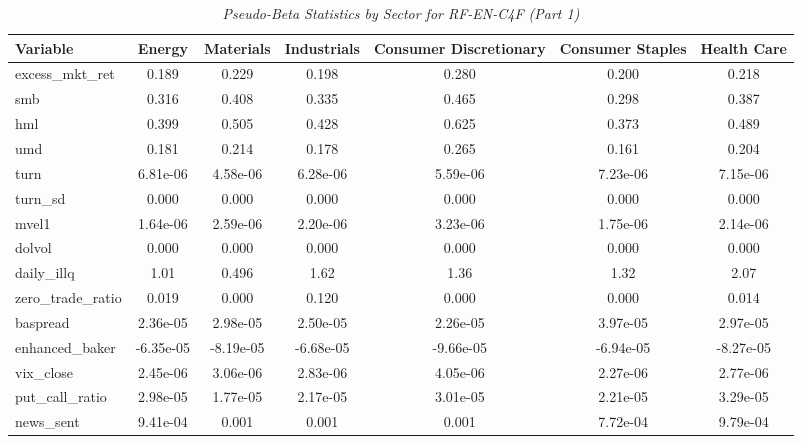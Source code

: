         \begin{table}[ht]
        \centering
        \caption{\textit{Pseudo-Beta Statistics by Sector for RF-EN-C4F (Part 1)}}
        \label{tab:rfi_statistics_1}
        \begin{tabular}{lcccccc}
        \toprule
        \textbf{Variable} & \textbf{Energy} & \textbf{Materials} & \textbf{Industrials} & \textbf{Consumer Discretionary} & \textbf{Consumer Staples} & \textbf{Health Care} \\
        \midrule
        excess\_mkt\_ret & 0.189 & 0.229 & 0.198 & 0.280 & 0.200 & 0.218 \\
smb & 0.316 & 0.408 & 0.335 & 0.465 & 0.298 & 0.387 \\
hml & 0.399 & 0.505 & 0.428 & 0.625 & 0.373 & 0.489 \\
umd & 0.181 & 0.214 & 0.178 & 0.265 & 0.161 & 0.204 \\
turn & 6.81e-06 & 4.58e-06 & 6.28e-06 & 5.59e-06 & 7.23e-06 & 7.15e-06 \\
turn\_sd & 0.000 & 0.000 & 0.000 & 0.000 & 0.000 & 0.000 \\
mvel1 & 1.64e-06 & 2.59e-06 & 2.20e-06 & 3.23e-06 & 1.75e-06 & 2.14e-06 \\
dolvol & 0.000 & 0.000 & 0.000 & 0.000 & 0.000 & 0.000 \\
daily\_illq & 1.01 & 0.496 & 1.62 & 1.36 & 1.32 & 2.07 \\
zero\_trade\_ratio & 0.019 & 0.000 & 0.120 & 0.000 & 0.000 & 0.014 \\
baspread & 2.36e-05 & 2.98e-05 & 2.50e-05 & 2.26e-05 & 3.97e-05 & 2.97e-05 \\
enhanced\_baker & -6.35e-05 & -8.19e-05 & -6.68e-05 & -9.66e-05 & -6.94e-05 & -8.27e-05 \\
vix\_close & 2.45e-06 & 3.06e-06 & 2.83e-06 & 4.05e-06 & 2.27e-06 & 2.77e-06 \\
put\_call\_ratio & 2.98e-05 & 1.77e-05 & 2.17e-05 & 3.01e-05 & 2.21e-05 & 3.29e-05 \\
news\_sent & 9.41e-04 & 0.001 & 0.001 & 0.001 & 7.72e-04 & 9.79e-04 \\
        \bottomrule
        \end{tabular}%
        \end{table}


